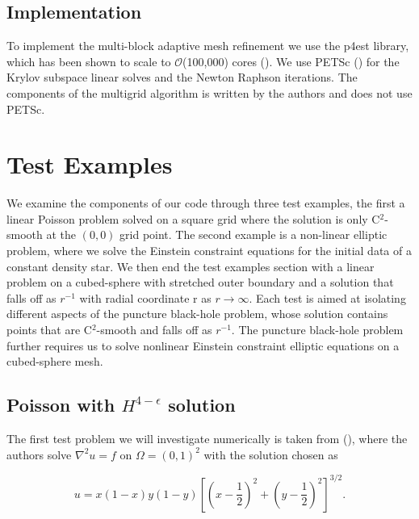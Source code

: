 \subsection{Implementation}

To implement the multi-block adaptive mesh refinement we use the p4est library, which has been shown to scale to $\mathcal{O}$(100,000) cores (\cite{burstedde2011p4est}). We use PETSc (\cite{petsc_home_page}) for the Krylov subspace linear solves and the Newton Raphson iterations. The components of the multigrid algorithm is written by the authors and does not use PETSc.


\section{Test Examples}

\label{sec:testexamples}
We examine the components of our code through three test examples, the first a linear Poisson problem solved on a square grid where the solution is only C$^{2}$-smooth at the $(0,0)$ grid point. The second example is a non-linear elliptic problem, where we solve the Einstein constraint equations for the initial data of a constant density star. We then end the test examples section with a linear problem on a cubed-sphere with stretched outer boundary and a solution that falls off as $r^{-1}$ with radial coordinate r as $r \rightarrow \infty$. Each test is aimed at isolating different aspects of the puncture black-hole problem, whose solution contains points that are C$^{2}$-smooth and falls off as $r^{-1}$. The puncture black-hole problem further requires us to solve nonlinear Einstein constraint elliptic equations on a cubed-sphere mesh.

\subsection{Poisson with $H^{4-\epsilon}$ solution}

The first test problem we will investigate numerically is taken from (\cite{stamm2010hp}), where the authors solve $\nabla^{2}u = f$ on $\Omega = (0,1)^{2}$ with the solution chosen as

\begin{equation}
    \label{eq:testexample1solution}
 u = x\left(1-x\right)y\left(1-y\right)\left[\left(x-\frac{1}{2}\right)^2 + \left(y-\frac{1}{2}\right)^2\right]^{3/2}.
\end{equation}

